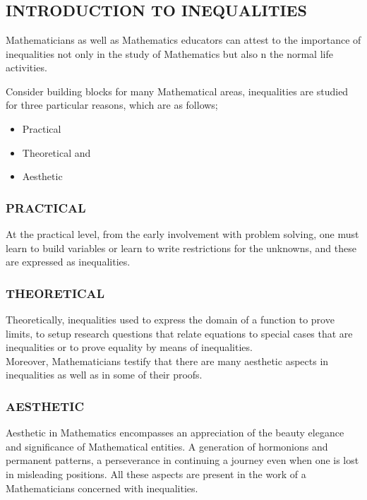 \documentclass[12pt]{report}
\newcommand{\spn}[1]{\\[#1cm]}
\newcommand{\NI}{\noindent}
\begin{document}
	\tableofcontents
	\newpage
	
	\chapter{}
	\section{INTRODUCTION TO INEQUALITIES}
	Mathematicians as well as Mathematics educators can attest to the importance of inequalities not only in the study of Mathematics but also n the normal life activities.
	
	Consider building blocks for many Mathematical areas, inequalities are studied for three particular reasons, which are as follows;
	\begin{itemize}
		\item Practical
		\item Theoretical and
		\item Aesthetic
	\end{itemize}

	\subsection{PRACTICAL}
	At the practical level, from the early involvement with problem solving, one must learn to build variables or learn to write restrictions for the unknowns, and these are expressed as inequalities.
	
	\subsection{THEORETICAL}
	Theoretically, inequalities used to express the domain of a function to prove limits, to setup research questions that relate equations to special cases that are inequalities or to prove equality by means of inequalities.\spn{-.3}
	
	\NI Moreover, Mathematicians testify that there are many aesthetic aspects in inequalities as well as in some of their proofs.
	
	\subsection{AESTHETIC}
	Aesthetic in Mathematics encompasses an appreciation of the beauty elegance and significance of Mathematical entities. A generation of hormonions and permanent patterns, a perseverance in continuing a journey even when one is lost in misleading positions. All these aspects are present in the work of a Mathematicians concerned with inequalities.
	
\end{document}
